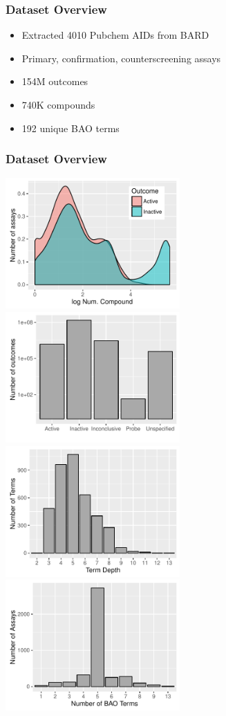 \documentclass[anchorcolor=blue,linkcolor=blue]{beamer}
\begin{document}
\begin{frame}
  \frametitle{Dataset Overview}
  \begin{itemize}
  \item Extracted 4010 Pubchem AIDs from BARD
  \item Primary, confirmation, counterscreening assays
  \item 154M outcomes
  \item 740K compounds
  \item 192 unique BAO terms
  \end{itemize}
\end{frame}

\begin{frame}
  \frametitle{Dataset Overview}
  \begin{center}
  \includegraphics[width=0.5\textwidth]{img-outcomehistogram}
  \includegraphics[width=0.5\textwidth]{img-bioassay-outcomes} \\
  \includegraphics[width=0.5\textwidth]{img-termdepth}
  \includegraphics[width=0.5\textwidth]{img-termassaycount} \\    
  \end{center}
\end{frame}
\end{document}
